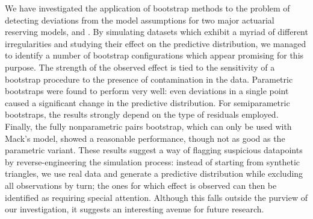 \documentclass[a4paper]{book}
\begin{document}
We have investigated the application of bootstrap methods to the problem of detecting deviations from the model assumptions for two major actuarial reserving models,  and . By simulating datasets which exhibit a myriad of different irregularities and studying their effect on the predictive distribution, we managed to identify a number of bootstrap configurations which appear promising for this purpose. The strength of the observed effect is tied to the sensitivity of a bootstrap procedure to the presence of contamination in the data. Parametric bootstraps were found to perform very well: even deviations in a single point caused a significant change in the predictive distribution. For semiparametric bootstraps, the results strongly depend on the type of residuals employed. Finally, the fully nonparametric pairs bootstrap, which can only be used with Mack's model, showed a reasonable performance, though not as good as the parametric variant. These results suggest a way of flagging suspicious datapoints by reverse-engineering the simulation process: instead of starting from synthetic triangles, we use real data and generate a predictive distribution while excluding all observations by turn; the ones for which effect is observed can then be identified as requiring special attention. Although this falls outside the purview of our investigation, it suggests an interesting avenue for future research.

\printbibliography%
\printindex
\end{document}
